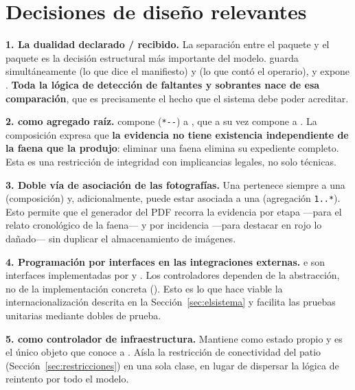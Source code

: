 \section{Decisiones de diseño relevantes}
\label{sec:decisiones}

\noindent \textbf{1. La dualidad declarado / recibido.} La separación entre el paquete  y el paquete  es la decisión estructural más importante del
modelo.  guarda simultáneamente  (lo que dice el
manifiesto) y  (lo que contó el operario), y expone
. \textbf{Toda la lógica de detección de faltantes y sobrantes nace de
esa comparación}, que es precisamente el hecho que el sistema debe poder acreditar.

\noindent \textbf{2.  como agregado raíz.}  compone (\texttt{*-\/-}) a
, que a su vez compone a . La composición expresa que \textbf{la
evidencia no tiene existencia independiente de la faena que la produjo}: eliminar una faena elimina
su expediente completo. Esta es una restricción de integridad con implicancias legales, no solo
técnicas.

\noindent \textbf{3. Doble vía de asociación de las fotografías.} Una  pertenece siempre a
una  (composición) y, adicionalmente, puede estar asociada a una
 (agregación \texttt{1..*}). Esto permite que el generador del PDF recorra la
evidencia por etapa ---para el relato cronológico de la faena--- y por incidencia ---para destacar
en rojo lo dañado--- sin duplicar el almacenamiento de imágenes.

\noindent \textbf{4. Programación por interfaces en las integraciones externas.}  e
 son interfaces implementadas por  y
. Los controladores dependen de la abstracción, no de la implementación
concreta (). Esto es lo que hace viable la internacionalización
descrita en la Sección~\ref{sec:elsistema} y facilita las pruebas unitarias mediante dobles de
prueba.

\noindent \textbf{5.  como controlador de infraestructura.} Mantiene
 como estado propio y es el único objeto que conoce a
. Aísla la restricción de conectividad del patio
(Sección~\ref{sec:restricciones}) en una sola clase, en lugar de dispersar la lógica de reintento
por todo el modelo.

